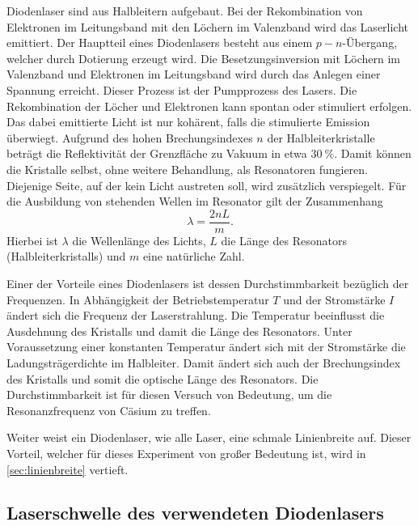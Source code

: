 \documentclass[../bericht.tex]{subfiles}
\begin{document}
      Diodenlaser sind aus Halbleitern aufgebaut. Bei der Rekombination von Elektronen im Leitungsband mit den L\"ochern im Valenzband wird das Laserlicht emittiert. Der Hauptteil eines Diodenlasers besteht aus einem $p-n$-\"Ubergang, welcher durch Dotierung erzeugt wird. Die Besetzungsinversion mit L\"ochern im Valenzband und Elektronen im Leitungsband wird durch das Anlegen einer Spannung erreicht. Dieser Prozess ist der Pumpprozess des Lasers. Die Rekombination der L\"ocher und Elektronen kann spontan oder stimuliert erfolgen. Das dabei emittierte Licht ist nur koh\"arent, falls die stimulierte Emission \"uberwiegt. Aufgrund des hohen Brechungsindexes $n$ der Halbleiterkristalle betr\"agt die Reflektivit\"at der Grenzfl\"ache zu Vakuum in etwa $\SI{30}{\percent}$. Damit k\"onnen die Kristalle selbst, ohne weitere Behandlung, als Resonatoren fungieren. Diejenige Seite, auf der kein Licht austreten soll, wird zus\"atzlich verspiegelt. F\"ur die Ausbildung von stehenden Wellen im Resonator gilt der Zusammenhang
      \begin{equation*}
        \lambda = \frac{2nL}{m}.
      \end{equation*}
      Hierbei ist $\lambda$ die Wellenl\"ange des Lichts, $L$ die L\"ange des Resonators (Halbleiterkristalls) und $m$ eine nat\"urliche Zahl.

      Einer der Vorteile eines Diodenlasers ist dessen Durchstimmbarkeit bez\"uglich der Frequenzen. In Abh\"angigkeit der Betriebstemperatur $T$ und der Stromst\"arke $I$ \"andert sich die Frequenz der Laserstrahlung. Die Temperatur beeinflusst die Ausdehnung des Kristalls und damit die L\"ange des Resonators. Unter Voraussetzung einer konstanten Temperatur \"andert sich mit der Stromst\"arke die Ladungstr\"agerdichte im Halbleiter. Damit \"andert sich auch der Brechungsindex des Kristalls und somit die optische L\"ange des Resonators.
      Die Durchstimmbarkeit ist f\"ur diesen Versuch von Bedeutung, um die Resonanzfrequenz von C\"asium zu treffen.
      \medskip

      Weiter weist ein Diodenlaser, wie alle Laser, eine schmale Linienbreite auf. Dieser Vorteil, welcher f\"ur dieses Experiment von großer Bedeutung ist, wird in \cref{sec:linienbreite} vertieft.


      \subsection{Laserschwelle des verwendeten Diodenlasers}
      \label{subsec:laserschwelle}
\end{document}
